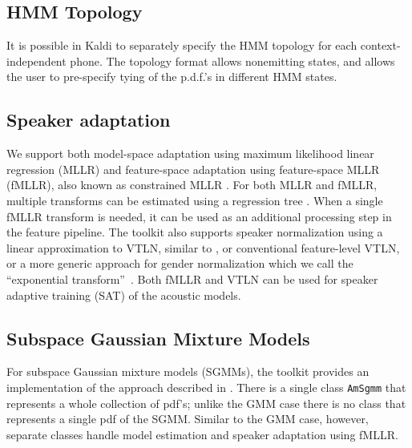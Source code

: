 \documentclass[10pt,conference,letterpaper]{IEEEtran}
\def \st {\small \tt}
\begin{document}
\subsection{HMM Topology}
It is possible in Kaldi to separately specify the HMM topology for each 
context-independent phone.  The topology format allows nonemitting states, and 
allows the user to pre-specify tying of the p.d.f.'s in different HMM states. 

\subsection{Speaker adaptation}
We support both model-space adaptation using maximum likelihood linear 
regression (MLLR) \cite{mllr} and feature-space adaptation using feature-space
MLLR (fMLLR), also known as constrained MLLR \cite{gales_linxform}. For both 
MLLR and fMLLR, multiple transforms can be estimated using a regression tree 
\cite{regtree}. When a single fMLLR transform is needed, it can be used as an 
additional processing step in the feature pipeline. 
The toolkit also supports speaker normalization using a linear approximation 
to VTLN, similar to \cite{lvtln}, or conventional feature-level VTLN, or
a more generic approach for gender normalization which we call the ``exponential 
transform''~\cite{asru_et}.  Both fMLLR and VTLN can be used for speaker adaptive training (SAT) of the acoustic models. 

\subsection{Subspace Gaussian Mixture Models}
For subspace Gaussian mixture models (SGMMs), the toolkit provides an 
implementation of the approach described in \cite{sgmm_csl}. There is a single 
class {\st AmSgmm} that represents a whole collection of pdf's; unlike the 
GMM case there is no class that represents a single pdf of the SGMM. Similar to 
the GMM case, however, separate classes handle model estimation and speaker 
adaptation using fMLLR.
\end{document}
